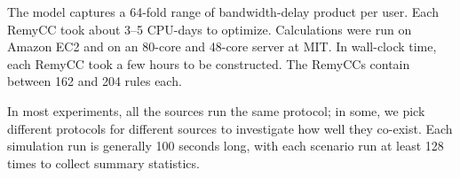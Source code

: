 \vspace{\baselineskip}

The model captures a 64-fold range of bandwidth-delay product per
user. Each RemyCC took about 3--5 CPU-days to optimize. Calculations
were run on Amazon EC2 and on an 80-core and 48-core server at MIT. In
wall-clock time, each RemyCC took a few hours to be constructed.
The RemyCCs contain between 162 and 204 rules each.

In most experiments, all the sources run the same protocol; in some,
we pick different protocols for different sources to investigate how
well they co-exist. Each simulation run is generally 100 seconds long,
with each scenario run at least 128 times to collect summary
statistics.

